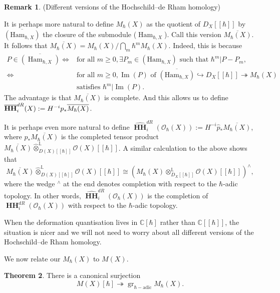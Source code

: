 \documentclass[draft]{article}
\theoremstyle{definition}
\newtheorem{theorem}{Theorem}[section]
\newtheorem{remark}[theorem]{Remark}
\DeclareMathOperator{\Image}{{Im}}
\DeclareMathOperator{\Ham}{{Ham}}
\DeclareMathOperator{\gr}{gr}
\DeclareMathOperator{\HH}{\mathbf{HH}}
\newcommand{\doubleh}{[\![ \hbar ]\!]}
\newcommand{\OhX}{\mathcal{O}_\hbar(X)}
\newcommand{\MhX}{M_\hbar(X)}
\newcommand{\OXh}{\mathcal{O}(X)\doubleh}
\begin{document}
\begin{remark}(Different versions of the Hochschild--de Rham homology)


It is perhaps more natural to define $M_\hbar(X)$ as the quotient of $D_X\doubleh$ by $\overline{(\text{Ham}_{\hbar,X})}$ the closure of the submodule ($\Ham_{\hbar,X}$). Call this version $\overline{M_\hbar(X)}$. It follows that $\overline{M_\hbar(X)}={M_\hbar(X)}/\bigcap_m \hbar^m M_\hbar(X)$. Indeed, this is because 
\begin{align*}
    P\in \overline{(\Ham_{\hbar,X})}\iff& \text{for all } m\geq 0, \exists P_m\in (\text{Ham}_{\hbar,X}) \text{ such that }\hbar^m|P-P_m, \\
    \iff&  \text{for all } m\geq 0, \Image(P) \text{ of } \overline{(\text{Ham}_{\hbar,X})}\hookrightarrow D_X\doubleh\twoheadrightarrow \MhX\\
    &\text{satisfies } \hbar^m|\Image(P).
\end{align*}
The advantage is that $\overline{\MhX}$ is complete. And this allows us to define $\overline{\HH}^{dR}_i(X)\\:=H^{-i}p_*\overline{M_\hbar(X)}$.

It is perhaps even more natural to define $\widehat{\HH}^{dR}_i(\OhX):= H^{-i}\hat{p}_*\overline{\MhX}$, where $\hat{p}_*\overline{\MhX}$ is the completed tensor product $\overline{\MhX}\widehat{\otimes}_{D(X)\doubleh}^\mathbb{L}\OXh$. A similar calculation to the above shows that $$\overline{\MhX}\widehat{\otimes}_{D(X)\doubleh}^\mathbb{L}\OXh\cong (\MhX\otimes^{\mathbb{L}}_{D_X\doubleh}\OXh)^{\wedge},$$ where the wedge $^\wedge$ at the end denotes completion with respect to the $\hbar$-adic topology. In other words, $\widehat{\HH}^{dR}_i(\OhX)$ is the completion of $\HH^{dR}_i(\OhX)$ with respect to the $\hbar$-adic topology. 

When the deformation quantisation lives in $\mathbb{C}[\hbar]$ rather than $\mathbb{C}\doubleh$, the situation is nicer and we will not need to worry about all different versions of the Hochschild--de Rham homology. 
\end{remark}

We now relate our $\MhX$ to $M(X)$.

\begin{theorem}\label{canonical_surjection}
There is a canonical surjection
\begin{equation}\label{star}\tag{$\dagger$}
    M(X)[\hbar]\twoheadrightarrow \gr_{\hbar-\text{adic}}M_{\hbar}(X). 
\end{equation}
\end{theorem}
\end{document}
